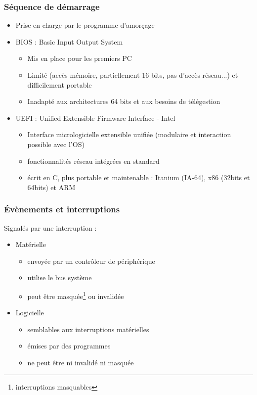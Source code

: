 \begin{frame}
\frametitle{Séquence de démarrage}
\begin{itemize}
\item Prise en charge par le programme d'amorçage
\item BIOS : Basic Input Output System \cite{wp-bios}
\begin{itemize}
\item Mis en place pour les premiers PC
\item Limité (accès mémoire, partiellement 16 bits, pas d'accès réseau...) et difficilement portable
\item Inadapté aux architectures 64 bits et aux besoins de télégestion
\end{itemize}

\item UEFI : Unified Extensible Firmware Interface \cite{wp-uefi} - Intel
\begin{itemize}
\item Interface micrologicielle extensible unifiée (modulaire et interaction possible avec l'OS)
\item fonctionnalités réseau intégrées en standard
\item écrit en C, plus portable et maintenable :  Itanium (IA-64), x86 (32bits et 64bits) et ARM
\end{itemize}
\end{itemize}
\end{frame}



\begin{frame}
\frametitle{Évènements et interruptions}
Signalés par une interruption :
\begin{itemize}
\item Matérielle
\begin{itemize}
\item envoyée par un contrôleur de périphérique
\item utilise le bus système
\item peut être masquée\footnote{interruptions masquables} ou invalidée
\end{itemize}
\item Logicielle
\begin{itemize}
\item semblables aux interruptions matérielles
\item émises par des programmes
\item ne peut être ni invalidé ni masquée
\end{itemize}
\end{itemize}
\end{frame}



